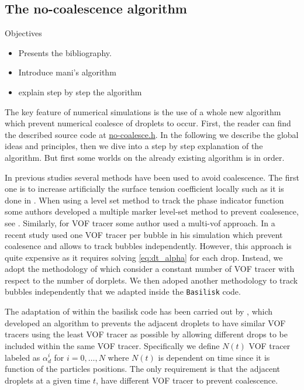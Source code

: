 \subsection{The no-coalescence algorithm}
Objectives 
\begin{itemize}
    \item Presents the bibliography. 
    \item Introduce mani's algorithm
    \item explain step by step the algorithm
\end{itemize}


The key feature of numerical simulations is the use of a whole new algorithm which prevent numerical coalesce of droplets to occur.
First, the reader can find the described source code at \href{https://basilisk.fr/sandbox/fintzin/no-coalesce.h}{no-coalesce.h}. 
In the following we describe the global ideas and principles, then we dive into a step by step explanation of the algorithm. 
But first some worlds on the already existing algorithm is in order.

In previous studies several methods have been used to avoid coalescence. 
The first one is to increase artificially the surface tension coefficient locally such as it is done in \citet{hidman2023assessing}.
When using a level set method to track the  phase indicator function some authors developed a multiple marker level-set method to prevent coalesence, see \citet{balcazar2015multiple}. 
Similarly, for VOF tracer some author used a multi-vof approach. 
In a recent study \citet{zhang2021direct} used one VOF tracer per bubble in his simulation which prevent coalesence and allows to track bubbles independently. 
However, this approach is quite expensive as it requires solving \ref{eq:dt_alpha} for each drop. 
Instead, we adopt the methodology of \citet{karnakov2022computing} which consider a constant number of VOF tracer with respect to the number of dorplets. 
We then adoped another methodology to track bubbles independently that we adapted inside the \texttt{Basilisk} code. 

The adaptation of  \citet{karnakov2022computing} within the basilisk code has been carried out by \citet{mani2021numerical}, which developed an algorithm to prevents the adjacent droplets to have similar VOF tracers using the least VOF tracer as possible by allowing different drops to be included within the same VOF tracer.
Specifically we define $N(t)$ VOF tracer labeled as $\alpha_d^i$ for $i =0,\ldots,N$ where $N(t)$ is dependent on time since it is function of the particles positions.  
The only requirement is that the adjacent droplets at a given time $t$, have different VOF tracer to prevent coalescence. 


